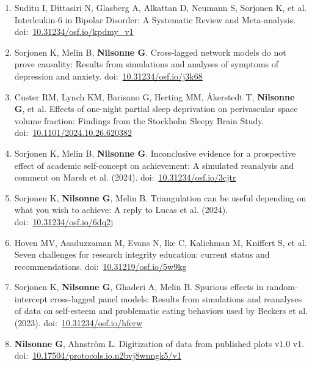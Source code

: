 \documentclass[11pt,a4paper]{article}
\begin{document}
\begin{enumerate}
\item Suditu I, Dittasiri N, Glasberg A, Alkattan D, Neumann S, Sorjonen K, et al. Interleukin-6 in Bipolar Disorder: A Systematic Review and Meta-analysis. doi:~\href{https://doi.org/10.31234/osf.io/kpdmy_v1}{10.31234/osf.io/kpdmy\_v1}

\item Sorjonen K, Melin B, \textbf{Nilsonne G}. Cross-lagged network models do not prove causality: Results from simulations and analyses of symptoms of depression and anxiety. doi:~\href{https://doi.org/10.31234/osf.io/j3k68}{10.31234/osf.io/j3k68}

\item Custer RM, Lynch KM, Barisano G, Herting MM, Åkerstedt T, \textbf{Nilsonne G}, et al. Effects of one-night partial sleep deprivation on perivascular space volume fraction: Findings from the Stockholm Sleepy Brain Study. doi:~\href{https://doi.org/10.1101/2024.10.26.620382}{10.1101/2024.10.26.620382}

\item Sorjonen K, Melin B, \textbf{Nilsonne G}. Inconclusive evidence for a prospective effect of academic self-concept on achievement: A simulated reanalysis and comment on Marsh et al. (2024). doi:~\href{https://doi.org/10.31234/osf.io/3cjtr}{10.31234/osf.io/3cjtr}

\item Sorjonen K, \textbf{Nilsonne G}, Melin B. Triangulation can be useful depending on what you wish to achieve: A reply to Lucas et al. (2024). doi:~\href{https://doi.org/10.31234/osf.io/6dq2j}{10.31234/osf.io/6dq2j}

\item Hoven MV, Asaduzzaman M, Evans N, Ike C, Kalichman M, Kniffert S, et al. Seven challenges for research integrity education: current status and recommendations. doi:~\href{https://doi.org/10.31219/osf.io/5w9kg}{10.31219/osf.io/5w9kg}

\item Sorjonen K, \textbf{Nilsonne G}, Ghaderi A, Melin B. Spurious effects in random-intercept cross-lagged panel models: Results from simulations and reanalyses of data on self-esteem and problematic eating behaviors used by Beckers et al. (2023). doi:~\href{https://doi.org/10.31234/osf.io/hferw}{10.31234/osf.io/hferw}

\item \textbf{Nilsonne G}, Ahnström L. Digitization of data from published plots v1.0 v1. doi:~\href{https://doi.org/10.17504/protocols.io.n2bvj8wnngk5/v1}{10.17504/protocols.io.n2bvj8wnngk5/v1}


\end{enumerate}
\end{document}
